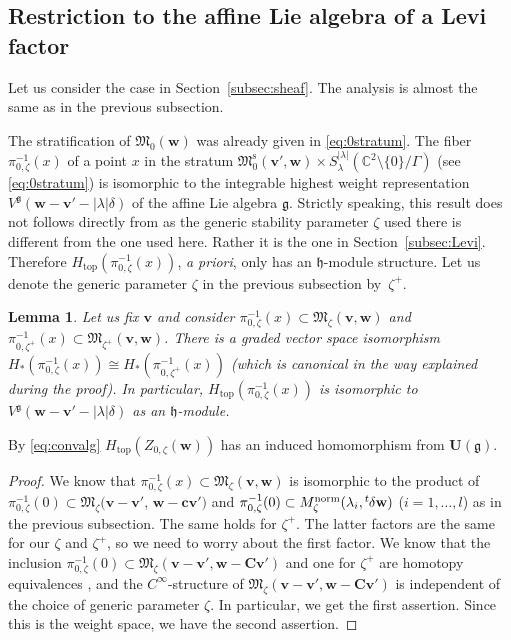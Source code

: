 \documentclass[pdftex]{sigma}
\newtheorem{Lemma}[equation]{Lemma}
\theoremstyle{definition}
\numberwithin{equation}{section}
\newcommand{\subsecref}[1]{Section~\ref{#1}}
\newcommand{\lsp}[2]{{\mskip-.3mu}{}^{#1}\mskip-1mu{#2}}
\newcommand{\C}{{\mathbb C}}
\newcommand{\g}{{\mathfrak g}}
\newcommand{\M}{{\mathfrak M}} %
\newcommand{\Mreg}{\M^{\operatorname{s}}}
\newcommand{\bv}{{\mathbf v}} %
\newcommand{\bw}{{\mathbf w}} %
\newcommand{\bC}{{\mathbf C}} %
\newcommand{\bc}{\mathbf c}
\newcommand{\topdeg}{{\operatorname{top}}} %
\newcommand{\bU}{\mathbf U} %
\begin{document}
\subsection[Restriction to the affine Lie algebra of a Levi factor]{Restriction to the af\/f\/ine Lie algebra of a Levi factor}

Let us consider the case in \subsecref{subsec:sheaf}. The analysis is
almost the same as in the previous subsection.

The stratif\/ication of $\M_0(\bw)$ was already given in
\eqref{eq:0stratum}.
%
The f\/iber $\pi_{0,\zeta}^{-1}(x)$ of a point $x$ in the stratum
$\Mreg_0(\bv',\bw)\times
S^{|\lambda|}_\lambda(\C^2\setminus\{0\}/\Gamma)$ (see
\eqref{eq:0stratum}) is isomorphic to the integrable highest weight
representation $V^\g(\bw - \bv' - |\lambda|\delta)$ of the af\/f\/ine Lie
algebra $\g$.
%
Strictly speaking, this result does not follows directly from
\cite{Na-alg} as the generic stability parameter $\zeta$ used there is
dif\/ferent from the one used here. Rather it is the one in
\subsecref{subsec:Levi}. Therefore
$H_{\topdeg}(\pi_{0,\zeta}^{-1}(x))$, {\it a priori\/}, only has an
$\mathfrak h$-module structure.
%
Let us denote the generic parameter $\zeta$ in the previous subsection
by~$\zeta^{+}$.

\begin{Lemma}
  Let us fix $\bv$ and consider $\pi_{0,\zeta}^{-1}(x)\subset
  \M_{\zeta}(\bv,\bw)$ and $\pi_{0,\zeta^+}^{-1}(x)\subset
  \M_{\zeta^+}(\bv,\bw)$. There is a graded vector space isomorphism
\(
   H_{*}(\pi_{0,\zeta}^{-1}(x)%
   )
   \cong
   H_{*}(\pi_{0,\zeta^+}^{-1}(x)%
   )
\)
\textup(which is canonical in the way explained during the
proof\textup). In particular, $H_{\topdeg}(\pi_{0,\zeta}^{-1}(x))$ is
isomorphic to $V^\g(\bw - \bv' - |\lambda|\delta)$ as an $\mathfrak
h$-module.
\end{Lemma}

By \eqref{eq:convalg} $H_{\topdeg}(Z_{0,\zeta}(\bw))$ has an induced
homomorphism from $\bU(\g)$.

\begin{proof}
  We know that $\pi_{0,\zeta}^{-1}(x)\subset \M_{\zeta}(\bv,\bw)$ is
  isomorphic to the product of $\pi_{0,\zeta}^{-1}(0)\subset
  \M_{\zeta}(\bv-\bv'$, $\bw-\bc\bv')$ and $\pi_{0,\zeta}^{-1}(0)\subset
  M_\zeta^{\text{norm}}(\lambda_i,\lsp{t}{\delta}\bw)$ ($i=1,\dots,
  l$) as in the previous subsection. The same holds for $\zeta^+$. The
  latter factors are the same for our $\zeta$ and $\zeta^+$, so we
  need to worry about the f\/irst factor. We know that the inclusion
  $\pi_{0,\zeta}^{-1}(0)\subset \M_\zeta(\bv-\bv',\bw-\bC\bv')$ and
  one for $\zeta^+$ are homotopy equivalences \cite[5.5]{Na-quiver},
  and the $C^\infty$-structure of $\M_\zeta(\bv-\bv',\bw-\bC\bv')$ is
  independent of the choice of generic parameter $\zeta$. In
  particular, we get the f\/irst assertion. Since this is the weight
  space, we have the second assertion.
\end{proof}
\end{document}
